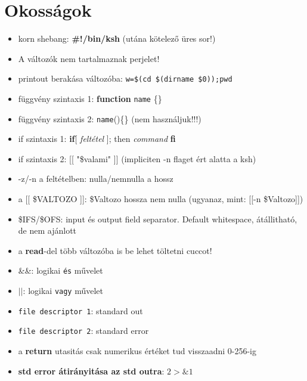 \documentclass{article}
\begin{document}
\section{Okosságok}
\begin{itemize}
	\item korn shebang: \textbf{\#!/bin/ksh} (utána kötelező üres sor!)
	\item A változók nem tartalmaznak perjelet!
	\item printout berakása változóba: \texttt{w=\$(cd \$(dirname \$0));pwd}
	\item függvény szintaxis 1: \textbf{function} \texttt{name} \{\}
	\item függvény szintaxis 2: \texttt{name}()\{\} (nem használjuk!!!)
	\item if szintaxis 1: \textbf{if}[ \textit{feltétel} ]; then \textit{command} \textbf{fi}
	\item if szintaxis 2: [[ "\$valami" ]] (impliciten -n flaget ért alatta a ksh)
	\item -z/-n a feltételben: nulla/nemnulla a hossz
	\item a [[ \$VALTOZO ]]: \$Valtozo hossza nem nulla (ugyanaz, mint: [[-n \$Valtozo]])
	\item \$IFS/\$OFS: input és output field separator. Default whitespace, átállitható, de nem ajánlott
	\item a \textbf{read}-del több változóba is be lehet töltetni cuccot!
	\item \&\&: logikai \texttt{és} művelet
	\item $||$: logikai \texttt{vagy} művelet
	\item \texttt{file descriptor 1}: standard out
	\item \texttt{file descriptor 2}: standard error
	\item a \textbf{return} utasitás csak numerikus értéket tud visszaadni 0-256-ig
	\item \textbf{std error átirányitása az std outra}: \textit{$2>\&1$}
	
\end{itemize}
\end{document}
